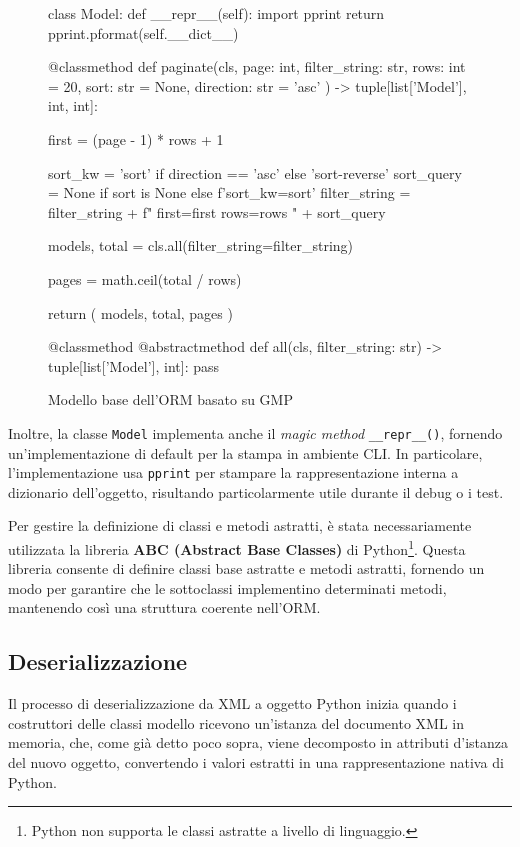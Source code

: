 \begin{figure}
\begin{pycode}
class Model:
    def __repr__(self):
        import pprint
        return pprint.pformat(self.__dict__)

    @classmethod
    def paginate(cls,
                 page: int,
                 filter_string: str,
                 rows: int = 20,
                 sort: str = None,
                 direction: str = 'asc'
                 ) -> tuple[list['Model'], int, int]:

        first = (page - 1) * rows + 1

        sort_kw = 'sort' if direction == 'asc' else 'sort-reverse'
        sort_query = None if sort is None else f'{sort_kw}={sort}'
        filter_string = filter_string + f" first={first} rows={rows} " + sort_query

        models, total = cls.all(filter_string=filter_string)

        pages = math.ceil(total / rows)

        return (
            models,
            total,
            pages
        )

    @classmethod
    @abstractmethod
    def all(cls, filter_string: str) -> tuple[list['Model'], int]:
        pass
\end{pycode}
\caption{Modello base dell'ORM basato su GMP}
\end{figure}

Inoltre, la classe \texttt{Model} implementa anche il \emph{magic method} \texttt{\_\_repr\_\_()}, fornendo un'implementazione di default per la stampa in ambiente CLI. In particolare, l'implementazione usa \texttt{pprint} per stampare la rappresentazione interna a dizionario dell'oggetto, risultando particolarmente utile durante il debug o i test.

Per gestire la definizione di classi e metodi astratti, è stata necessariamente utilizzata la libreria \textbf{ABC (Abstract Base Classes)} di Python\footnote{Python non supporta le classi astratte a livello di linguaggio.}. Questa libreria consente di definire classi base astratte e metodi astratti, fornendo un modo per garantire che le sottoclassi implementino determinati metodi, mantenendo così una struttura coerente nell'ORM.

\subsection{Deserializzazione}
Il processo di deserializzazione da XML a oggetto Python inizia quando i costruttori delle classi modello ricevono un'istanza del documento XML in memoria, che, come già detto poco sopra, viene decomposto in attributi d'istanza del nuovo oggetto, convertendo i valori estratti in una rappresentazione nativa di Python.

